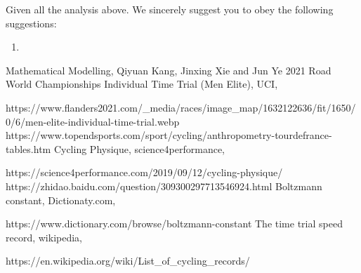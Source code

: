 \documentclass[12pt]{article}
\newcommand{\wholepages}{\pageref{LastPage}}
\newcommand{\itembf}{\item \textbf}
\theoremstyle{definition}
\theoremstyle{remark}
\numberwithin{equation}{section}
\begin{document}
	Given all the analysis above. We sincerely suggest you to obey the following suggestions:
	\begin{enumerate}

		\itembf{}
	\end{enumerate}
	\newpage
	\renewcommand\refname{References}
	\begin{thebibliography}{100}
		 Mathematical Modelling, Qiyuan Kang, Jinxing Xie and Jun Ye
		2021 Road World Championships Individual Time Trial (Men Elite), UCI,
		
		https://www.flanders2021.com/\_media/races/image\_map/1632122636/fit/1650/0/6/men-elite-individual-time-trial.webp
		https://www.topendsports.com/sport/cycling/anthropometry-tourdefrance-tables.htm
		Cycling Physique, science4performance,
		
		https://science4performance.com/2019/09/12/cycling-physique/
		https://zhidao.baidu.com/question/309300297713546924.html
		Boltzmann constant, Dictionaty.com,
		
		https://www.dictionary.com/browse/boltzmann-constant
		The time trial speed record, wikipedia,

		https://en.wikipedia.org/wiki/List\_of\_cycling\_records/
	\end{thebibliography} 
\end{document}
